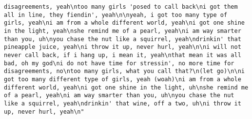 \documentclass[]{article}
\begin{document}
\begin{verbatim}
disagreements, yeah\ntoo many girls 'posed to call back\ni got them all in line, they fiendin', yeah\n\nyeah, i got too many type of girls, yeah\ni am from a whole different world, yeah\ni got one shine in the light, yeah\nshe remind me of a pearl, yeah\ni am way smarter than you, uh\nyou chase the nut like a squirrel, yeah\ndrinkin' that pineapple juice, yeah\ni throw it up, never hurl, yeah\n\ni will not never call back, if i hang up, i mean it, yeah\nthat mean it was all bad, oh my god\ni do not have time for stressin', no more time for disagreements, no\ntoo many girls, what you call that?\n(let go)\n\ni got too many different type of girls, yeah (woah)\ni am from a whole different world, yeah\ni got one shine in the light, uh\nshe remind me of a pearl, yeah\ni am way smarter than you, uh\nyou chase the nut like a squirrel, yeah\ndrinkin' that wine, off a two, uh\ni throw it up, never hurl, yeah\n"                                                                                                                                                                                                                                                                                                                                                                                                                                                                                                                                                                                                                                                                                                                                                                                                                                                                                                                                                                                                                                                                                                                                                                                                                                                                                                                                                                                                                                                                                                                                                                                                                                                                                                                                                                                                                                                                                                                                                                                                                                                     

\end{verbatim}
\end{document}
